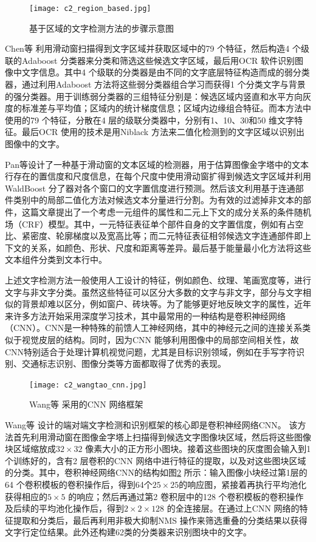     \begin{figure}[!h]
    \centering
    \texttt{[image: c2\_region\_based.jpg]}
    \caption{基于区域的文字检测方法的步骤示意图}
    \label{fig.c2_region_based}
    \end{figure}

    Chen等\cite{Chen2004Detecting} 利用滑动窗扫描得到文字区域并获取区域中的79 个特征，然后构造4 个级联的Adaboost 分类器来分类和筛选这些候选文字区域，最后用OCR 软件识别图像中文字信息。其中4 个级联的分类器是由不同的文字底层特征构造而成的弱分类器，通过利用Adaboost 方法将这些弱分类器组合学习而获得1 个分类文字与背景的强分类器。用于训练弱分类器的三组特征分别是：候选区域内竖直和水平方向灰度的标准差与平均值；区域内的统计梯度信息；区域内边缘组合特征。而本方法中使用的79 个特征，分散在4 层的级联分类器中，分别有1、10、30和50 维文字特征。最后OCR 使用的技术是用Niblack 方法来二值化检测到的文字区域以识别出图像中的文字。

    Pan等\cite{Pan2011A}设计了一种基于滑动窗的文本区域的检测器，用于估算图像金字塔中的文本行存在的置信度和尺度信息，在每个尺度中使用滑动窗扩得到候选文字区域并利用WaldBoost 分了器对各个窗口的文字置信度进行预测。然后该文利用基于连通部件类别中的局部二值化方法对候选文本分量进行分割。为有效的过滤掉非文本的部件，这篇文章提出了一个考虑一元组件的属性和二元上下文的成分关系的条件随机场（CRF）模型。其中，一元特征表征单个部件自身的文字置信度，例如有占空比、紧密度、轮廓梯度以及宽高比等；而二元特征表征相邻候选文字连通部件即上下文的关系，如颜色、形状、尺度和距离等差异。最后基于能量最小化方法将这些文本组件分类到文本行中。

    上述文字检测方法一般使用人工设计的特征，例如颜色、纹理、笔画宽度等，进行文字与非文字分类。虽然这些特征可以区分大多数的文字与非文字，部分与文字相似的背景却难以区分，例如窗户、砖块等。为了能够更好地反映文字的属性，近年来许多方法开始采用深度学习技术，其中最常用的一种结构是卷积神经网络（CNN）。CNN是一种特殊的前馈人工神经网络，其中的神经元之间的连接关系类似于视觉皮层的结构。同时，因为CNN 能够利用图像中的局部空间相关性，故CNN特别适合于处理计算机视觉问题，尤其是目标识别领域，例如在手写字符识别、交通标志识别、图像分类等方面都取得了优秀的表现。

    \begin{figure}[!h]
    \centering
    \texttt{[image: c2\_wangtao\_cnn.jpg]}
    \caption{Wang等\cite{Wang2012End} 采用的CNN 网络框架}
    \label{fig.c2_wangtao_cnn}
    \end{figure}

    Wang等\cite{Wang2012End} 设计的端对端文字检测和识别框架的核心即是卷积神经网络CNN。 该方法首先利用滑动窗在图像金字塔上扫描得到候选文字图像块区域，然后将这些图像块区域缩放成$32\times32$ 像素大小的正方形小图块。接着这些图块的灰度图会输入到1 个训练好的，含有2 层卷积的CNN 网络中进行特征的提取，以及对这些图块区域的分类。其中，卷积神经网络CNN的结构如图\ref{fig.c2_wangtao_cnn} 所示：输入图像小块经过第1层的64 个卷积模板的卷积操作后，得到64个$25\times25$的响应图，紧接着再执行平均池化获得相应的$5\times5$ 的响应；然后再通过第2 卷积层中的128 个卷积模板的卷积操作及后续的平均池化操作后，得到$2\times2\times128$ 的全连接层。在通过上CNN 网络的特征提取和分类后，最后再利用非极大抑制NMS 操作来筛选重叠的分类结果以获得文字行定位结果。此外还构建62类的分类器来识别图块中的文字。

